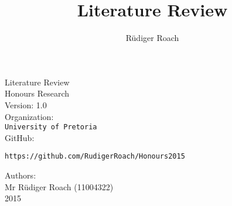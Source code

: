 \documentclass[12pt,a4paper]{report}
\author{Rüdiger Roach}
\title{Literature Review}
\begin{document}
\begin{titlepage}
\begin{center}
\huge Literature Review\\[0.15cm]
\huge Honours Research\\[0.15cm]
\large Version: 1.0\\[1cm]
Organization:\\
\texttt{University of Pretoria}\\[0.5cm]
GitHub:\\[0.01cm]
\begin{verbatim}
https://github.com/RudigerRoach/Honours2015
\end{verbatim}
Authors:\\

Mr Rüdiger Roach (11004322)\\
2015
\end{center}
\end{titlepage}
\end{document}
